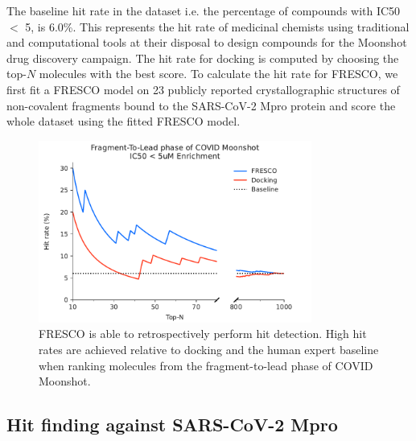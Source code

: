 The baseline hit rate in the dataset i.e. the percentage of compounds with IC50 $<$ 5\uM, is 6.0\%. This represents the hit rate of medicinal chemists using traditional and computational tools at their disposal to design compounds for the Moonshot drug discovery campaign. The hit rate for docking is computed by choosing the top-$N$ molecules with the best score. To calculate the hit rate for FRESCO, we first fit a FRESCO model on 23 publicly reported crystallographic structures of non-covalent fragments bound to the SARS-CoV-2 Mpro protein \cite{Douangamath2020XChem} and score the whole dataset using the fitted FRESCO model.

\begin{figure}[th]
    \centering
    \includegraphics[width=0.8\textwidth]{Chapters/Fresco/Figs/fresco_vs_moonshot_break_5uM.pdf}
    \caption{FRESCO is able to retrospectively perform hit detection. High hit rates are achieved relative to docking and the human expert baseline when ranking molecules from the fragment-to-lead phase of COVID Moonshot.}
    \label{fig:moonshot_enrichment_vs_docking}
\end{figure}

\subsection{Hit finding against SARS-CoV-2 Mpro} \label{subsec:prospective}

